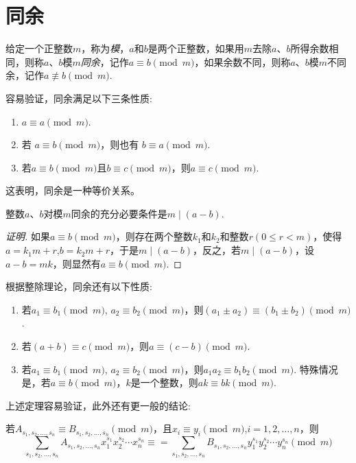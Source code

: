 
\section{同余}
\label{sec:congruences}

\begin{definition}
  给定一个正整数$m$，称为\emph{模}，$a$和$b$是两个正整数，如果用$m$去除$a$、$b$所得余数相同，则称$a$、$b$模$m$\emph{同余}，记作$a \equiv b \pmod{m}$，如果余数不同，则称$a$、$b$模$m$不同余，记作$a \not \equiv b \pmod{m}$.
\end{definition}

容易验证，同余满足以下三条性质:
\begin{enumerate}
\item $a \equiv a \pmod{m}$.
\item 若 $a \equiv b \pmod{m}$，则也有 $b \equiv a \pmod{m}$.
\item 若$a \equiv b \pmod{m}$且$b \equiv c \pmod{m}$，则$a \equiv c \pmod{m}$.
\end{enumerate}
这表明，同余是一种等价关系。

\begin{theorem}
  整数$a$、$b$对模$m$同余的充分必要条件是$m \mid (a-b)$.
\end{theorem}

\begin{proof}[证明]
  如果$a \equiv b \pmod{m}$，则存在两个整数$k_1$和$k_2$和整数$r(0 \leqslant r < m)$，使得$a=k_1m+r$,$b=k_2m+r$，于是$m \mid (a-b)$，反之，若$m \mid (a-b)$，设$a-b=mk$，则显然有$a \equiv b \pmod{m}$.
\end{proof}

\begin{theorem}
根据整除理论，同余还有以下性质:
\begin{enumerate}
\item 若$a_1 \equiv b_1 \pmod{m}$, $a_2 \equiv b_2 \pmod{m}$，则$(a_1\pm a_2) \equiv (b_1 \pm b_2) \pmod{m}$.
\item 若$(a+b) \equiv c \pmod{m}$，则$a \equiv (c-b) \pmod{m}$.
\item 若$a_1 \equiv b_1 \pmod{m}$, $a_2 \equiv b_2 \pmod{m}$，则$a_1a_2 \equiv b_1b_2 \pmod{m}$. 特殊情况是，若$a \equiv b \pmod{m}$，$k$是一个整数，则$ak \equiv bk \pmod{m}$.
\end{enumerate}
\end{theorem}

上述定理容易验证，此外还有更一般的结论:
\begin{theorem}
  若$A_{s_1,s_2,\ldots,s_n} \equiv B_{s_1,s_2,\ldots,s_n} \pmod{m}$，且$x_i \equiv y_i \pmod{m}$,$i=1,2,\ldots,n$，则
  \[ \sum_{s_1,s_2,\ldots,s_n} A_{s_1,s_2,\ldots,s_n} x_1^{s_1}x_2^{s_2} \cdots x_n^{s_n} \equiv =  \sum_{s_1,s_2,\ldots,s_n} B_{s_1,s_2,\ldots,s_n} y_1^{s_1}y_2^{s_2} \cdots y_n^{s_n} \pmod{m} \]
\end{theorem}

